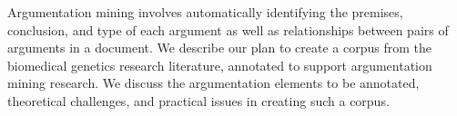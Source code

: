 Argumentation mining involves automatically identifying the premises, conclusion, and type of each argument as well as relationships between pairs of arguments in a document. We describe our plan to create a corpus from the biomedical genetics research literature, annotated to support argumentation mining research. We discuss the argumentation elements to be annotated, theoretical challenges, and practical issues in creating such a corpus.
